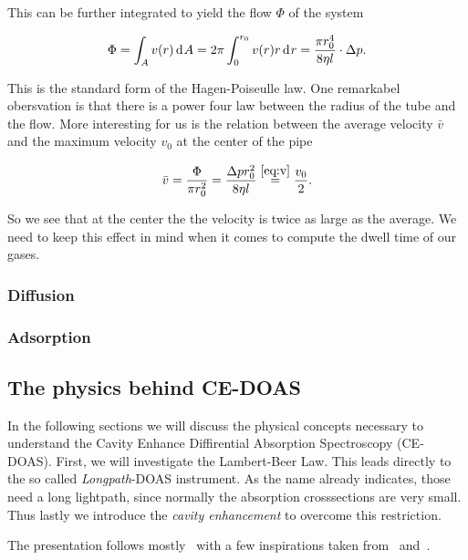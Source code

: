 This can be further integrated to yield the flow $\Phi$ of the system

\begin{align*}
  \Phi = \int_A v(r) \d[A] = 2\pi \int_0^{r_0} v(r)r \d[r] = \frac{\pi
  r_0^4}{8\eta l} \cdot \Delta p.
\end{align*}

This is the standard form of the Hagen-Poiseulle law. One remarkabel
obersvation is that there is a power four law between the radius of
the tube and the flow. More interesting for us is the relation between
the average velocity $\bar v$ and the maximum velocity $v_0$ at the
center of the pipe

\begin{align*}
  \bar v = \frac{\Phi}{\pi r_0^2} = \frac{\Delta p r_0^2}{8\eta l} \stackrel{\eqref{eq:v}}{=} \frac{v_0}{2}.
\end{align*}

So we see that at the center the the velocity is twice as large as the
average. We need to keep this effect in mind when it comes to compute
the dwell time of our gases.

\subsubsection{Diffusion}
\label{sec:diffusion}



\subsubsection{Adsorption}
\label{sec:adsorption}

\subsection{The physics behind CE-DOAS}
\label{sec:ce-doas-physics}

In the following sections we will discuss the physical concepts
necessary to understand the Cavity Enhance Diffirential Absorption
Spectroscopy (CE-DOAS). First, we will investigate the Lambert-Beer
Law. This leads directly to the so called \emph{Longpath}-DOAS
instrument. As the name already indicates, those need a long
lightpath, since normally the absorption crosssections are very
small. Thus lastly we introduce the \emph{cavity enhancement} to
overcome this restriction.

The presentation follows mostly~\cite{fp58} with a few inspirations
taken from~\cite{bsc} and~\cite{platt2008differential}.

